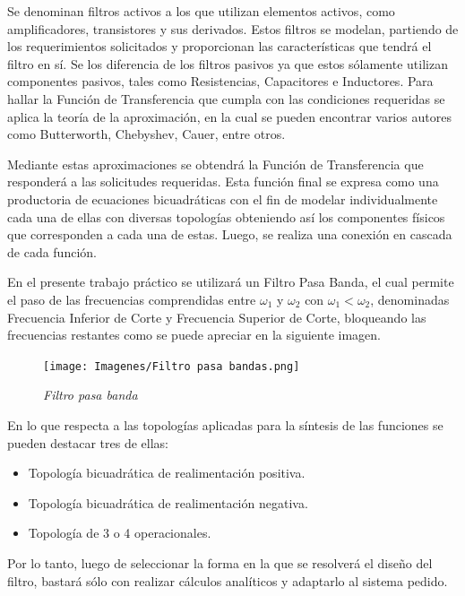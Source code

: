 \documentclass[12pt,A4paper,titlepage]{article}
\begin{document}
\bigskip
\hspace{1mm} Se denominan filtros activos a los que utilizan elementos activos, como amplificadores, transistores y sus derivados. Estos filtros se modelan, partiendo de los requerimientos solicitados y proporcionan las características que tendrá el filtro en sí. Se los diferencia de los filtros pasivos ya que estos sólamente utilizan componentes pasivos, tales como Resistencias, Capacitores e Inductores. Para hallar la Función de Transferencia que cumpla con las condiciones requeridas se aplica la teoría de la aproximación, en la cual se pueden encontrar varios autores como Butterworth, Chebyshev, Cauer, entre otros.

\bigskip
\hspace{1mm} Mediante estas aproximaciones se obtendrá la Función de Transferencia que responderá a las solicitudes requeridas. Esta función final se expresa como una productoria de ecuaciones bicuadráticas con el fin de modelar individualmente cada una de ellas con diversas topologías obteniendo así los componentes físicos que corresponden a cada una de estas. Luego, se realiza una conexión en cascada de cada función. 

\bigskip
\hspace{1mm} En el presente trabajo práctico se utilizará un Filtro Pasa Banda, el cual permite el paso de las frecuencias comprendidas entre \(\omega_1 \) y \(\omega_2 \) con \(\omega_1 < \omega_2 \), denominadas Frecuencia Inferior de Corte y Frecuencia Superior de Corte, bloqueando las frecuencias restantes como se puede apreciar en la siguiente imagen. 

\begin{figure}[!h] 
  \centering
  \texttt{[image: Imagenes/Filtro pasa bandas.png]}
  \caption{\textit{Filtro pasa banda}}
\end{figure}

\hspace{1mm} En lo que respecta a las topologías aplicadas para la síntesis de las funciones se pueden destacar tres de ellas:

\begin{itemize}[itemsep=1pt]
    \item Topología bicuadrática de realimentación positiva.
    \item Topología bicuadrática de realimentación negativa.
    \item Topología de 3 o 4 operacionales. 
\end{itemize}

\hspace{1mm} Por lo tanto, luego de seleccionar la forma en la que se resolverá el diseño del filtro, bastará sólo con realizar cálculos analíticos y adaptarlo al sistema pedido.
\end{document}
